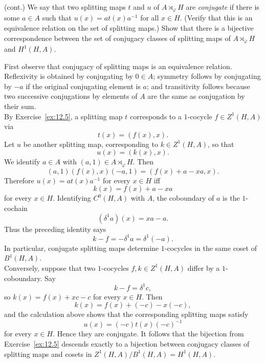 \documentclass[../Odyssey_Project.tex]{subfiles}
\begin{document}
\begin{exercise}
\label{ex:12.6}
(cont.) We say that two splitting maps $t$ and $u$ of $A \rtimes_\varphi H$ are \emph{conjugate} if there is some $a \in A$ such that $u(x) = at(x)a^{-1}$ for all $x \in H$. (Verify that this is an equivalence relation on the set of splitting maps.) Show that there is a bijective correspondence between the set of conjugacy classes of splitting maps of $A \rtimes_\varphi H$ and $H^1(H, A)$.
\end{exercise}
\begin{solution}
    First observe that conjugacy of splitting maps is an equivalence relation. Reflexivity is obtained by conjugating by $0 \in A$; symmetry follows by conjugating by $-a$ if the original conjugating element is $a$; and transitivity follows because two successive conjugations by elements of $A$ are the same as conjugation by their sum.\\
    By Exercise~\ref{ex:12.5}, a splitting map $t$ corresponds to a $1$-cocycle $f \in Z^1(H,A)$ via
    \[
        t(x) = (f(x),x).
    \]
    Let $u$ be another splitting map, corresponding to $k \in Z^1(H,A)$, so that
    \[
        u(x) = (k(x),x).
    \]
    We identify $a \in A$ with $(a,1) \in A \rtimes_\varphi H$. Then
    \[
        (a,1)(f(x),x)(-a,1)
        = (f(x)+a-xa,x).
    \]
    Therefore $u(x)=at(x)a^{-1}$ for every $x \in H$ iff
    \[
        k(x) = f(x)+a-xa
    \]
    for every $x \in H$. Identifying $C^0(H,A)$ with $A$, the coboundary of $a$ is the $1$-cochain
    \[
        (\delta^1 a)(x) = xa-a.
    \]
    Thus the preceding identity says
    \[
        k-f = -\delta^1 a = \delta^1(-a).
    \]
    In particular, conjugate splitting maps determine $1$-cocycles in the same coset of $B^1(H,A)$.\\
    Conversely, suppose that two $1$-cocycles $f,k \in Z^1(H,A)$ differ by a $1$-coboundary. Say
    \[
        k-f = \delta^1 c,
    \]
    so $k(x)=f(x)+xc-c$ for every $x \in H$. Then
    \[
        k(x)=f(x)+(-c)-x(-c),
    \]
    and the calculation above shows that the corresponding splitting maps satisfy
    \[
        u(x)=(-c)t(x)(-c)^{-1}
    \]
    for every $x \in H$. Hence they are conjugate. It follows that the bijection from Exercise~\ref{ex:12.5} descends exactly to a bijection between conjugacy classes of splitting maps and cosets in $Z^1(H,A)/B^1(H,A)=H^1(H,A)$.
\end{solution}
\end{document}
